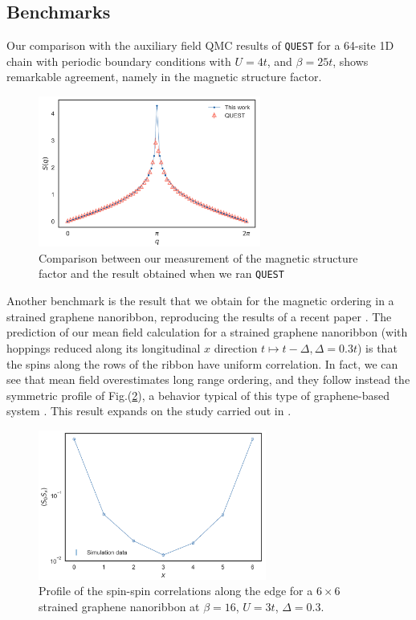 \subsection{Benchmarks}
Our comparison with the auxiliary field QMC results of \texttt{QUEST} for a 64-site 1D chain with periodic boundary conditions with $U = 4 t$, and $\beta = 25 t$, shows remarkable agreement, namely in the magnetic structure factor.
\begin{figure}[H]
  \centering
  \includegraphics[width=7.3cm]{images/s_compare.png}
  \caption{Comparison between our measurement of the magnetic structure factor and the result obtained when we ran \texttt{QUEST}}
  \label{figdetVSquest}
\end{figure}
Another benchmark is the result that we obtain for the magnetic ordering in a strained graphene nanoribbon, reproducing the results of a recent paper \cite{yang_strain-tuning_2017}.
The prediction of our mean field calculation for a strained graphene nanoribbon (with hoppings reduced along its longitudinal $x$ direction $t \mapsto t - \Delta, \Delta = 0.3t$) is that the spins along the rows of the ribbon have uniform correlation.
In fact, we can see that mean field overestimates long range ordering, and they follow instead the symmetric profile of Fig.(\ref{fig:corrProf}), a behavior typical of this type of graphene-based system \cite{feldner_dynamical_2011, raczkowski_interplay_2017}.
This result expands on the study carried out in \cite{yang_strain-tuning_2017}.
\begin{figure}[H]
  \centering
  \includegraphics[width = 7.5cm]{images/LongitudinalProfile.png}
  \caption{Profile of the spin-spin correlations along the edge for a $ 6 \times 6$ strained graphene nanoribbon at $\beta = 16$, $U = 3t$, $\Delta = 0.3$.}
  \label{fig:corrProf}
\end{figure}
